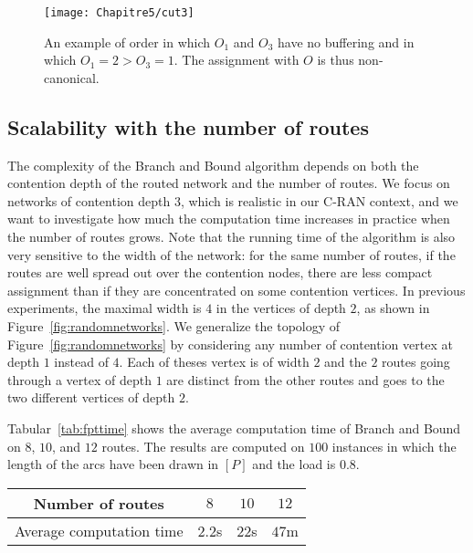 \begin{itemize}
\begin{center}
\begin{figure}[h]
  \centering
\texttt{[image: Chapitre5/cut3]}
\caption{ An example of order in which $O_1$ and $O_3$ have no buffering and in which $O_1 = 2 > O_3 = 1$. The assignment with $O$ is thus non-canonical.}
\label{fig:cut3}
\end{figure}
\end{center}
\end{itemize}



\subsection{Scalability with the number of routes}

The complexity of the Branch and Bound algorithm depends on both the contention depth of the routed network and the number of routes. We focus on networks of contention depth $3$, which is realistic in our C-RAN context, and we want to investigate how much the computation time increases in practice when the number of routes grows. Note that the running time
of the algorithm is also very sensitive to the width of the network: for the same number of routes, if the routes are well spread out over the contention nodes, there are less compact assignment than if they are concentrated on some contention vertices. In previous experiments, the maximal width is $4$ in the vertices of depth $2$, as shown in Figure~\ref{fig:randomnetworks}. We generalize the topology of Figure~\ref{fig:randomnetworks} by considering any number of 
contention vertex at depth $1$ instead of $4$. Each of theses vertex is of width $2$ and the $2$ routes going through a vertex of depth $1$ are distinct from the other routes and goes to the two different vertices of depth $2$. 

Tabular~\ref{tab:fpttime} shows the average computation time of Branch and Bound on $8$, $10$, and $12$ routes. The results are computed on $100$ instances in which the length of the arcs have been drawn in $[P]$ and the load is $0.8$.
\begin{center}
\begin{tabular}{ |c|c|c|c| }
\hline
    Number of routes & $8$ & $10$ & $12$\\
    \hline
    Average computation time  & $2.2$s & $22$s & $47$m  \\
    \hline
 \end{tabular}
\end{center}

